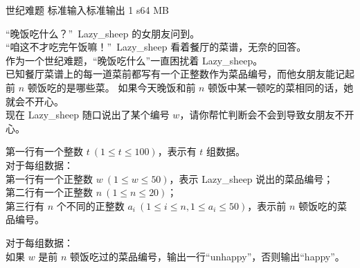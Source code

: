 \gdef\thisproblemauthor{Lazy\_sheep}
\begin{problem}{世纪难题}
{标准输入}{标准输出}
{1 s}{64 MB}{}

``晚饭吃什么？''\ Lazy\_sheep 的女朋友问到。\\
``咱这不才吃完午饭嘛！''\ Lazy\_sheep 看着餐厅的菜谱，无奈的回答。\\
作为一个世纪难题，“晚饭吃什么”一直困扰着 Lazy\_sheep。\\
已知餐厅菜谱上的每一道菜前都写有一个正整数作为菜品编号，而他女朋友能记起前 $n$ 顿饭吃的是哪些菜。
如果今天晚饭和前 $n$ 顿饭中某一顿吃的菜相同的话，她就会不开心。\\
现在 Lazy\_sheep 随口说出了某个编号 $w$，请你帮忙判断会不会到导致女朋友不开心。

\InputFile

第一行有一个整数 $t\ (1 \le t \le 100)$，表示有 $t$ 组数据。\\
对于每组数据：\\
第一行有一个正整数 $w\ (1\le w\le 50)$，表示 Lazy\_sheep 说出的菜品编号；\\
第二行有一个正整数 $n\ (1\le n\le 20)$；\\
第三行有 $n$ 个不同的正整数 $a_i\ (1\le i\le n,1\le a_i\le 50)$，表示前 $n$ 顿饭吃的菜品编号。

\OutputFile

对于每组数据：\\
如果 $w$ 是前 $n$ 顿饭吃过的菜品编号，输出一行``unhappy''，否则输出``happy''。

\Example

\begin{example}
%
\end{example}

\end{problem}
